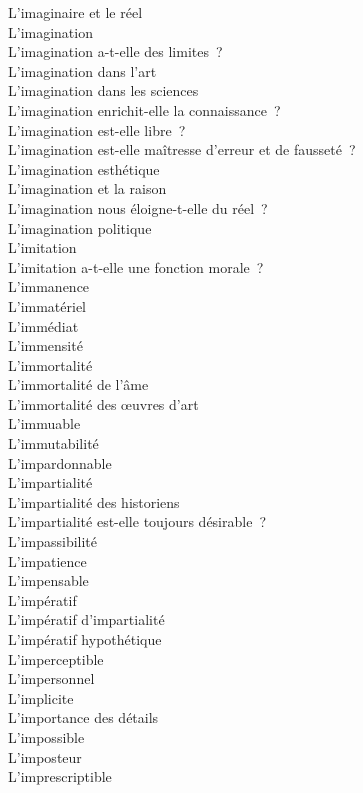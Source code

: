 \documentclass[a4paper,12pt]{article}
\begin{document}
L'imaginaire et le réel \\
L'imagination \\
L'imagination a-t-elle des limites ? \\
L'imagination dans l'art \\
L'imagination dans les sciences \\
L'imagination enrichit-elle la connaissance ? \\
L'imagination est-elle libre ? \\
L'imagination est-elle maîtresse d'erreur et de fausseté ? \\
L'imagination esthétique \\
L'imagination et la raison \\
L'imagination nous éloigne-t-elle du réel ? \\
L'imagination politique \\
L'imitation \\
L'imitation a-t-elle une fonction morale ? \\
L'immanence \\
L'immatériel \\
L'immédiat \\
L'immensité \\
L'immortalité \\
L'immortalité de l'âme \\
L'immortalité des œuvres d'art \\
L'immuable \\
L'immutabilité \\
L'impardonnable \\
L'impartialité \\
L'impartialité des historiens \\
L'impartialité est-elle toujours désirable ? \\
L'impassibilité \\
L'impatience \\
L'impensable \\
L'impératif \\
L'impératif d'impartialité \\
L'impératif hypothétique \\
L'imperceptible \\
L'impersonnel \\
L'implicite \\
L'importance des détails \\
L'impossible \\
L'imposteur \\
L'imprescriptible \\
\end{document}
